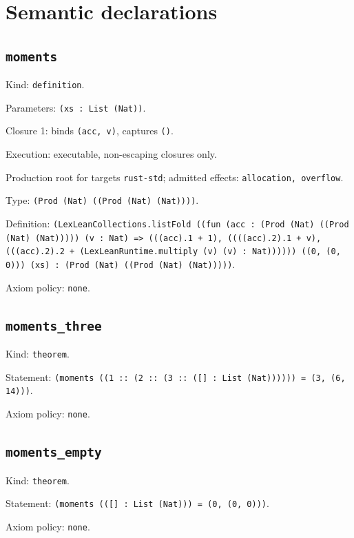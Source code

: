\documentclass[11pt]{article}
\begin{document}
\section*{Semantic declarations}
\subsection*{\texttt{moments}}
\noindent Kind: \texttt{definition}.\par
\noindent Parameters: \texttt{(xs : List (Nat))}.\par
\noindent Closure 1: binds \texttt{(acc, v)}, captures \texttt{()}.\par
\noindent Execution: executable, non-escaping closures only.\par
\noindent Production root for targets \texttt{rust-std}; admitted effects: \texttt{allocation, overflow}.\par
\noindent Type: \texttt{(Prod (Nat) ((Prod (Nat) (Nat))))}.\par
\noindent Definition: \texttt{(LexLeanCollections.listFold ((fun (acc : (Prod (Nat) ((Prod (Nat) (Nat))))) (v : Nat) => (((acc).1 + 1), ((((acc).2).1 + v), (((acc).2).2 + (LexLeanRuntime.multiply (v) (v) : Nat)))))) ((0, (0, 0))) (xs) : (Prod (Nat) ((Prod (Nat) (Nat)))))}.\par
\noindent Axiom policy: \texttt{none}.\par
\subsection*{\texttt{moments\_three}}
\noindent Kind: \texttt{theorem}.\par
\noindent Statement: \texttt{(moments ((1 :: (2 :: (3 :: ([] : List (Nat)))))) = (3, (6, 14)))}.\par
\noindent Axiom policy: \texttt{none}.\par
\subsection*{\texttt{moments\_empty}}
\noindent Kind: \texttt{theorem}.\par
\noindent Statement: \texttt{(moments (([] : List (Nat))) = (0, (0, 0)))}.\par
\noindent Axiom policy: \texttt{none}.\par
\end{document}
